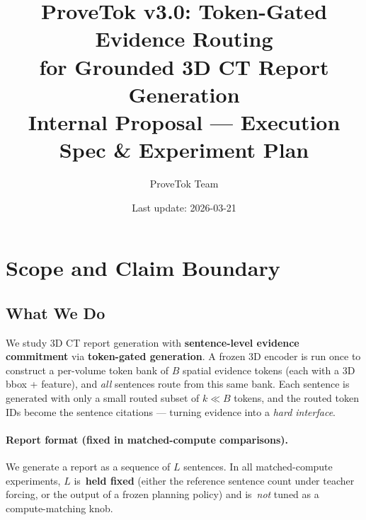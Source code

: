 \documentclass[11pt,a4paper]{article}
\title{\textbf{ProveTok v3.0: Token-Gated Evidence Routing\\for Grounded 3D CT Report Generation}\\[6pt]
\large Internal Proposal --- Execution Spec \& Experiment Plan}
\author{ProveTok Team}
\date{Last update: 2026-03-21}
\begin{document}
\maketitle
\tableofcontents
\newpage

\section{Scope and Claim Boundary}


\subsection{What We Do}
We study 3D CT report generation with \textbf{sentence-level evidence commitment} via \textbf{token-gated generation}.
A frozen 3D encoder is run once to construct a per-volume token bank of $B$ spatial evidence tokens (each with a 3D bbox + feature), and \emph{all} sentences route from this same bank.
Each sentence is generated with only a small routed subset of $k\ll B$ tokens, and the routed token IDs become the sentence citations --- turning evidence into a \emph{hard interface}.

\paragraph{Report format (fixed in matched-compute comparisons).}
We generate a report as a sequence of $L$ sentences.
In all matched-compute experiments, $L$ is \,\textbf{held fixed} (either the reference sentence count under teacher forcing, or the output of a frozen planning policy) and is \,\emph{not} tuned as a compute-matching knob.
\end{document}
